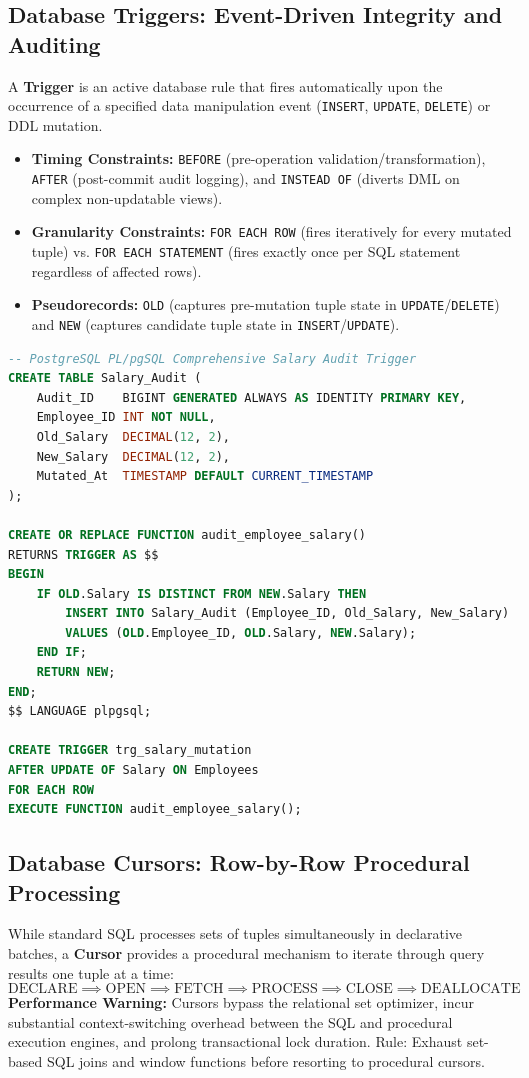 \subsection{Database Triggers: Event-Driven Integrity and Auditing}
A \textbf{Trigger} is an active database rule that fires automatically upon the occurrence of a specified data manipulation event (\texttt{INSERT}, \texttt{UPDATE}, \texttt{DELETE}) or DDL mutation.
\begin{itemize}
    \item \textbf{Timing Constraints:} \texttt{BEFORE} (pre-operation validation/transformation), \texttt{AFTER} (post-commit audit logging), and \texttt{INSTEAD OF} (diverts DML on complex non-updatable views).
    \item \textbf{Granularity Constraints:} \texttt{FOR EACH ROW} (fires iteratively for every mutated tuple) vs. \texttt{FOR EACH STATEMENT} (fires exactly once per SQL statement regardless of affected rows).
    \item \textbf{Pseudorecords:} \texttt{OLD} (captures pre-mutation tuple state in \texttt{UPDATE}/\texttt{DELETE}) and \texttt{NEW} (captures candidate tuple state in \texttt{INSERT}/\texttt{UPDATE}).
\end{itemize}

\begin{lstlisting}[language=SQL]
-- PostgreSQL PL/pgSQL Comprehensive Salary Audit Trigger
CREATE TABLE Salary_Audit (
    Audit_ID    BIGINT GENERATED ALWAYS AS IDENTITY PRIMARY KEY,
    Employee_ID INT NOT NULL,
    Old_Salary  DECIMAL(12, 2),
    New_Salary  DECIMAL(12, 2),
    Mutated_At  TIMESTAMP DEFAULT CURRENT_TIMESTAMP
);

CREATE OR REPLACE FUNCTION audit_employee_salary()
RETURNS TRIGGER AS $$
BEGIN
    IF OLD.Salary IS DISTINCT FROM NEW.Salary THEN
        INSERT INTO Salary_Audit (Employee_ID, Old_Salary, New_Salary)
        VALUES (OLD.Employee_ID, OLD.Salary, NEW.Salary);
    END IF;
    RETURN NEW;
END;
$$ LANGUAGE plpgsql;

CREATE TRIGGER trg_salary_mutation
AFTER UPDATE OF Salary ON Employees
FOR EACH ROW
EXECUTE FUNCTION audit_employee_salary();
\end{lstlisting}

\subsection{Database Cursors: Row-by-Row Procedural Processing}
While standard SQL processes sets of tuples simultaneously in declarative batches, a \textbf{Cursor} provides a procedural mechanism to iterate through query results one tuple at a time:
\begin{equation}
\text{DECLARE} \implies \text{OPEN} \implies \text{FETCH} \implies \text{PROCESS} \implies \text{CLOSE} \implies \text{DEALLOCATE}
\end{equation}
\textbf{Performance Warning:} Cursors bypass the relational set optimizer, incur substantial context-switching overhead between the SQL and procedural execution engines, and prolong transactional lock duration. Rule: Exhaust set-based SQL joins and window functions before resorting to procedural cursors.

